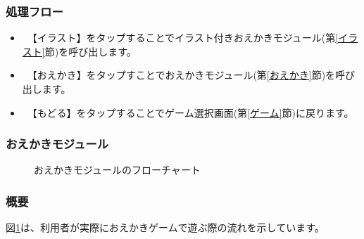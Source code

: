\documentclass[a4j]{jarticle}
\begin{document}
\subsubsection*{処理フロー}
\begin{itemize}
\item　【イラスト】をタップすることでイラスト付きおえかきモジュール(第\ref{イラスト}節)を呼び出します。
\item　【おえかき】をタップすことでおえかきモジュール(第\ref{おえかき}節)を呼び出します。
\item　【もどる】をタップすることでゲーム選択画面(第\ref{ゲーム}節)に戻ります。
\end{itemize}

\newpage
\subsubsection{おえかきモジュール\label{おえかき}}
\begin{figure}[H]
    \begin{center}
    \caption {おえかきモジュールのフローチャート}
    \label{oekaki2}
    \end{center}
\end{figure}

\subsubsection*{概要}
図\ref{oekaki2}は、利用者が実際におえかきゲームで遊ぶ際の流れを示しています。
\end{document}
